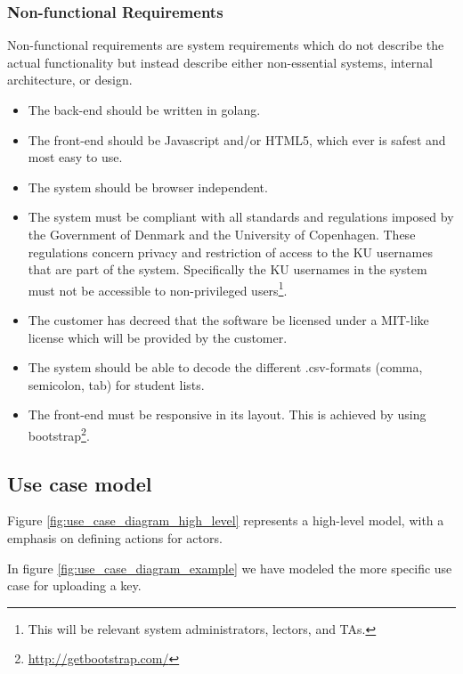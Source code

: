 \documentclass[11pt,a4paper]{report}
\begin{document}
\subsubsection{Non-functional Requirements}\label{subsubsec:Non_Functional_Req}
Non-functional requirements are system requirements which do not describe the actual functionality but instead describe either non-essential systems, internal architecture, or design.
\begin{itemize}
\item The back-end should be written in golang.
\item The front-end should be Javascript and/or HTML5, which ever is safest and most easy to use.
\item The system should be browser independent.
\item The system must be compliant with all standards and regulations imposed by the Government of Denmark and the University of Copenhagen. These regulations concern privacy and restriction of access to the KU usernames that are part of the system. Specifically the KU usernames in the system must not be accessible to non-privileged users\footnote{This will be relevant system administrators, lectors, and TAs.}.
\item The customer has decreed that the software be licensed under a MIT-like license which will be provided by the customer.
\item The system should be able to decode the different .csv-formats (comma, semicolon, tab) for student lists.
\item The front-end must be responsive in its layout. This is achieved by using bootstrap\footnote{\href{http://getbootstrap.com/}{http://getbootstrap.com/}}.
\end{itemize}

\subsection{Use case model}\label{subsec:Use_case_model}

Figure \ref{fig:use_case_diagram_high_level} represents a high-level model, with a emphasis on defining actions for actors.

In figure \ref{fig:use_case_diagram_example} we have modeled the more specific use case for uploading a key.
\end{document}
